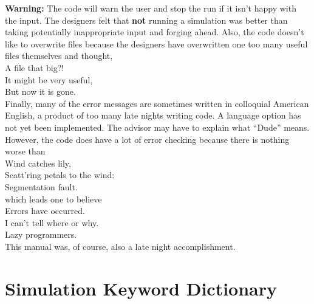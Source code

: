 \documentclass[12pt,titlepage]{article}
\begin{document}
{\bf Warning:} The code will warn the user and stop the run if it isn't happy
with the input. The designers felt that {\bf not} running a
simulation was better than taking potentially inappropriate input 
and forging ahead. 
Also, the code doesn't like to overwrite files because the designers
have overwritten one too many useful files themselves and thought,  \\
\hspace*{1.25in}  A file that big?! \\
\hspace*{1.25in}  It might be very useful,\\
\hspace*{1.25in}  But now it is gone.\\
Finally, many of the error messages are sometimes written in colloquial American English, 
a product of too many late nights writing code. A language option has
not yet been implemented. The advisor may have to explain what
``Dude'' means.  However, the code does have a lot of error
checking because there is nothing worse than \\
\hspace*{1.25in}    Wind catches lily, \\
\hspace*{1.25in}    Scatt'ring petals to the wind:\\
\hspace*{1.25in}    Segmentation fault.\\
which leads one to believe \\
\hspace*{1.25in}  Errors have occurred. \\
\hspace*{1.25in}  I can't tell where or why.\\
\hspace*{1.25in}  Lazy programmers.\\
This manual was, of course, also a late night accomplishment.

\newpage
\section{\bf Simulation Keyword Dictionary} 
\end{document}
